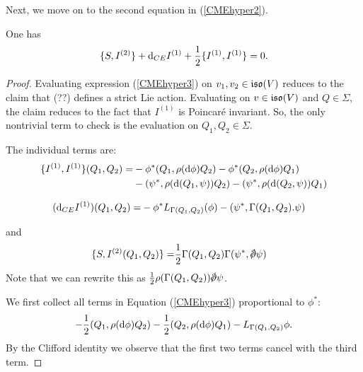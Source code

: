 \documentclass[10pt, oneside]{article}
\begin{document}
Next, we move on to the second equation in (\ref{CMEhyper2}). 

\begin{lemma} 
One has
\begin{equation}\label{CMEhyper3}
\{S, I^{(2)}\} + {\rm d}_{CE} I^{(1)} + \frac{1}{2} \{I^{(1)}, I^{(1)}\} = 0 .
\end{equation}
\end{lemma}
\begin{proof}
Evaluating expression (\ref{CMEhyper3}) on $v_1,v_2 \in \mathfrak{iso}(V)$ reduces to the claim that (??) defines a strict Lie action. 
Evaluating on $v \in \mathfrak{iso}(V)$ and $Q \in \Sigma$, the claim reduces to the fact that $I^{(1)}$ is Poincar\'{e} invariant.
So, the only nontrivial term to check is the evaluation on $Q_1,Q_2 \in \Sigma$. 

The individual terms are:
\begin{align*}
\{I^{(1)}, I^{(1)}\}(Q_1, Q_2) = & - \phi^* (Q_1, \rho({\rm d} \phi) Q_2) - \phi^* (Q_2, \rho({\rm d} \phi)Q_1) \\ &  -  (\psi^*, \rho({\rm d}(Q_1,\psi))Q_2) - (\psi^*, \rho({\rm d}(Q_2, \psi)) Q_1) 
\end{align*}

\begin{align*}
({\rm d}_{CE}I^{(1)})(Q_1,Q_2) = & - \phi^* L_{\Gamma(Q_1,Q_2)} (\phi) - (\psi^*, \Gamma(Q_1,Q_2) . \psi)
\end{align*}

and
\begin{align*}
\{S, I^{(2)}(Q_1,Q_2)\} = & \frac{1}{2} \Gamma(Q_1,Q_2) \Gamma(\psi^*, \sd \dd \psi) 
\end{align*}
Note that we can rewrite this as $\frac{1}{2} \rho(\Gamma(Q_1, Q_2)) \sd \dd \psi$. 

We first collect all terms in Equation (\ref{CMEhyper3}) proportional to $\phi^*$:
\[
- \frac{1}{2} (Q_1, \rho({\rm d}\phi) Q_2) - \frac{1}{2} (Q_2, \rho({\rm d} \phi) Q_1) - L_{\Gamma(Q_1,Q_2)} \phi .
\]
By the Clifford identity
 we observe that the first two terms cancel with the third term.  


\end{proof}
\end{document}
